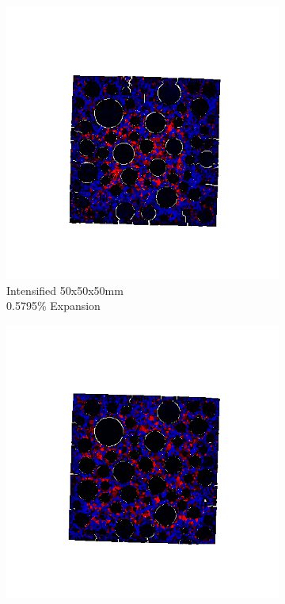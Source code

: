 \begin{figure}[ht!]
    \begin{subfigure}{.3\textwidth}
      \centering
      \includegraphics[width=.9\linewidth]{Files/exp_3D/DEF/A30X0C_3_stress.png}
    \caption{Intensified 50x50x50mm \\  0.5795\% Expansion}
    \end{subfigure}%
    \begin{subfigure}{.3\textwidth}
      \centering
      \includegraphics[width=.9\linewidth]{Files/exp_3D/DEF/A30X-5C_3_stress.png}

\end{subfigure}
\end{figure}
